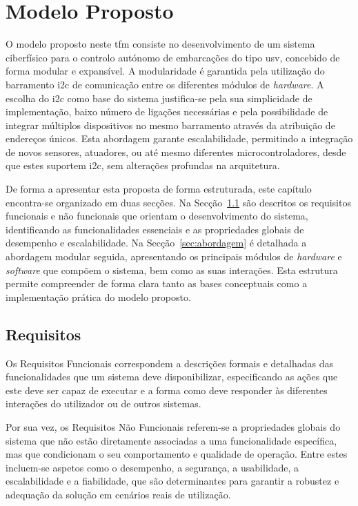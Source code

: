 \chapter{Modelo Proposto}
\label{ch:modeloProposto}

O modelo proposto neste \gls{tfm} consiste no desenvolvimento de um sistema ciberfísico para o controlo autónomo de embarcações do tipo \gls{usv}, concebido de forma modular e expansível. A modularidade é garantida pela utilização do barramento \gls{i2c} de comunicação entre os diferentes módulos de \emph{hardware}. A escolha do \gls{i2c} como base do sistema justifica-se pela sua simplicidade de implementação, baixo número de ligações necessárias e pela possibilidade de integrar múltiplos dispositivos no mesmo barramento através da atribuição de endereços únicos. Esta abordagem garante escalabilidade, permitindo a integração de novos sensores, atuadores, ou até mesmo diferentes microcontroladores, desde que estes suportem \gls{i2c}, sem alterações profundas na arquitetura.

De forma a apresentar esta proposta de forma estruturada, este capítulo encontra-se organizado em duas secções. Na Secção~\ref{sec:requisitos} são descritos os requisitos funcionais e não funcionais que orientam o desenvolvimento do sistema, identificando as funcionalidades essenciais e as propriedades globais de desempenho e escalabilidade. Na Secção~\ref{sec:abordagem} é detalhada a abordagem modular seguida, apresentando os principais módulos de \emph{hardware} e \emph{software} que compõem o sistema, bem como as suas interações. Esta estrutura permite compreender de forma clara tanto as bases conceptuais como a implementação prática do modelo proposto.

\section{Requisitos}
\label{sec:requisitos}

Os Requisitos Funcionais correspondem a descrições formais e detalhadas das funcionalidades que um sistema deve disponibilizar, especificando as ações que este deve ser capaz de executar e a forma como deve responder às diferentes interações do utilizador ou de outros sistemas.  

Por sua vez, os Requisitos Não Funcionais referem-se a propriedades globais do sistema que não estão diretamente associadas a uma funcionalidade específica, mas que condicionam o seu comportamento e qualidade de operação. Entre estes incluem-se aspetos como o desempenho, a segurança, a usabilidade, a escalabilidade e a fiabilidade, que são determinantes para garantir a robustez e adequação da solução em cenários reais de utilização.

